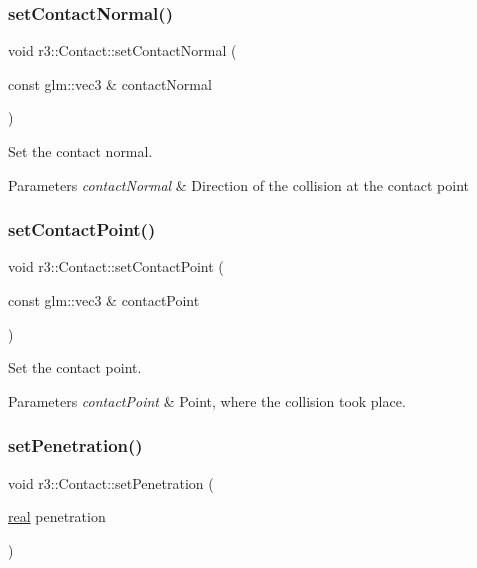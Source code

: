 \subsubsection{\texorpdfstring{set\+Contact\+Normal()}{setContactNormal()}}
{\footnotesize\ttfamily void r3\+::\+Contact\+::set\+Contact\+Normal (\begin{DoxyParamCaption}\item[{const glm\+::vec3 \&}]{contact\+Normal }\end{DoxyParamCaption})}



Set the contact normal. 


\begin{DoxyParams}{Parameters}
{\em contact\+Normal} & Direction of the collision at the contact point \\
\hline
\end{DoxyParams}
\mbox{\label{classr3_1_1_contact_aedd044892a1adf0692b7cc9f81b4436a}} 
\subsubsection{\texorpdfstring{set\+Contact\+Point()}{setContactPoint()}}
{\footnotesize\ttfamily void r3\+::\+Contact\+::set\+Contact\+Point (\begin{DoxyParamCaption}\item[{const glm\+::vec3 \&}]{contact\+Point }\end{DoxyParamCaption})}



Set the contact point. 


\begin{DoxyParams}{Parameters}
{\em contact\+Point} & Point, where the collision took place. \\
\hline
\end{DoxyParams}
\mbox{\label{classr3_1_1_contact_a828feb22ff02fe787739eb5d87cfec38}} 
\subsubsection{\texorpdfstring{set\+Penetration()}{setPenetration()}}
{\footnotesize\ttfamily void r3\+::\+Contact\+::set\+Penetration (\begin{DoxyParamCaption}\item[{\mbox{\hyperlink{namespacer3_ab2016b3e3f743fb735afce242f0dc1eb}{real}}}]{penetration }\end{DoxyParamCaption})}



